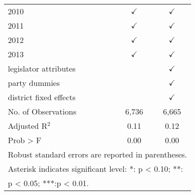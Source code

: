 \begin{table}[ht]
\begin{tabular}{lcc}
\footnotesize{2010}             & $\checkmark$         & $\checkmark$  \tabularnewline
\footnotesize{2011}             & $\checkmark$         & $\checkmark$  \tabularnewline
\footnotesize{2012}             & $\checkmark$         & $\checkmark$  \tabularnewline
\footnotesize{2013}             & $\checkmark$         & $\checkmark$  \tabularnewline
\footnotesize{legislator attributes}       &           & $\checkmark$  \tabularnewline
\footnotesize{party dummies}               &           & $\checkmark$  \tabularnewline
\footnotesize{district fixed effects}      &           & $\checkmark$  \tabularnewline
\midrule
\footnotesize{No. of Observations}   & 6,736      & 6,665                                       \tabularnewline
\footnotesize{Adjusted R$^{2}$}      & 0.11       & 0.12                                        \tabularnewline
\footnotesize{Prob > F}              & 0.00       & 0.00                                          \tabularnewline
\midrule
\multicolumn{3}{l}{{\footnotesize{}Robust standard errors are reported in parentheses.}}           \tabularnewline
\multicolumn{3}{l}{{\footnotesize{}Asterisk indicates significant level: {*}: p < 0.10; {*}{*}:}}  \tabularnewline
\multicolumn{3}{l}{{\footnotesize{} p < 0.05; {*}{*}{*}:p < 0.01.}}                                \tabularnewline
\end{tabular}
\end{table}